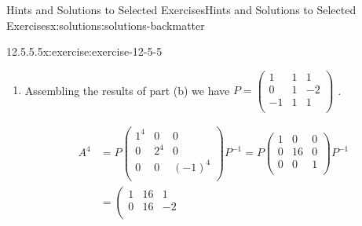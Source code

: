 \documentclass[twoside,10pt,]{book}
\numberwithin{equation}{section}
\begin{document}
\begin{solutions-chapter}{Hints and Solutions to Selected Exercises}{}{Hints and Solutions to Selected Exercises}{}{}{x:solutions:solutions-backmatter}
\begin{divisionsolution}{12.5.5.5}{}{x:exercise:exercise-12-5-5}
\begin{enumerate}[label=(\alph*)]
If  \(c = -1\), then the system determining the eigenvectors is \(\left(
\begin{array}{ccc}
2 & 1 & 0 \\
1 & 1 & 1 \\
0 & 1 & 2 \\
\end{array}
\right)\left(
\begin{array}{c}
x_1 \\
x_2 \\
x_3 \\
\end{array}
\right)=\left(
\begin{array}{c}
0 \\
0 \\
0 \\
\end{array}
\right)\) and we can select \(\left(
\begin{array}{c}
1 \\
-2 \\
1 \\
\end{array}
\right)\),  although any nonzero multiple of this vector could be the third column of \(P\).%
\item{}Assembling the results of part (b) we have \(P=\left(
\begin{array}{ccc}
1 & 1 & 1 \\
0 & 1 & -2 \\
-1 & 1 & 1 \\
\end{array}
\right)\) .%
\par
%
\begin{equation*}
\begin{split}
A^4  & = P \left(
\begin{array}{ccc}
1^4 & 0 & 0 \\
0 & 2^4 & 0 \\
0 & 0 & (-1)^{4 } \\
\end{array}
\right)P^{-1}= P \left(
\begin{array}{ccc}
1 & 0 & 0 \\
0 & 16 & 0 \\
0 & 0 & 1 \\
\end{array}
\right)P^{-1}\\
&=\left(
\begin{array}{ccc}
1 & 16 & 1 \\
0 & 16 & -2 \\

\end{array}
\end{split}
\end{equation*}
\end{enumerate}
\end{divisionsolution}
\end{solutions-chapter}
\end{document}
